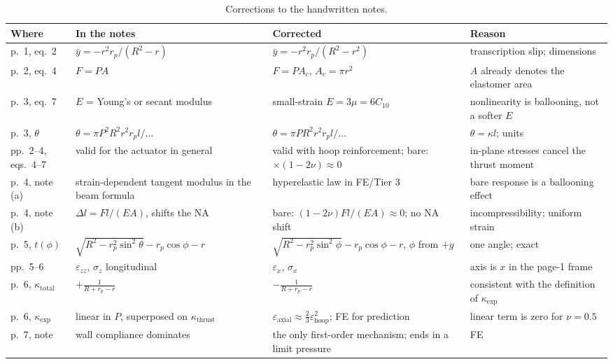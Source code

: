 \documentclass[11pt,a4paper]{article}
\numberwithin{equation}{section}
\newcommand{\rp}{r_p}
\begin{document}
\begin{table}[H]
\centering\small
\renewcommand{\arraystretch}{1.25}
\begin{tabularx}{\textwidth}{@{}l>{\raggedright\arraybackslash}X>{\raggedright\arraybackslash}X>{\raggedright\arraybackslash}X@{}}
\toprule
Where & In the notes & Corrected & Reason\\
\midrule
p.~1, eq.~2 & $\bar y = -r^2\rp/(R^2-r)$ & $\bar y = -r^2\rp/(R^2-r^2)$ & transcription slip; dimensions\\
p.~2, eq.~4 & $F = PA$ & $F = PA_c$, $A_c=\pi r^2$ & $A$ already denotes the elastomer area\\
p.~3, eq.~7 & $E$ = Young's or secant modulus & small-strain $E = 3\mu = 6C_{10}$ & nonlinearity is ballooning, not a softer $E$\\
p.~3, $\theta$ & $\theta = \pi P^2R^2r^2\rp l/\ldots$ & $\theta = \pi P R^2r^2\rp l/\ldots$ & $\theta=\kappa l$; units\\
pp.~2--4, eqs.~4--7 & valid for the actuator in general & valid with hoop reinforcement; bare: $\times(1-2\nu)\approx0$ & in-plane stresses cancel the thrust moment\\
p.~4, note (a) & strain-dependent tangent modulus in the beam formula & hyperelastic law in FE/Tier 3 & bare response is a ballooning effect\\
p.~4, note (b) & $\Delta l = Fl/(EA)$, shifts the NA & bare: $(1-2\nu)Fl/(EA)\approx0$; no NA shift & incompressibility; uniform strain\\
p.~5, $t(\phi)$ & $\sqrt{R^2-\rp^2\sin^2\theta}-\rp\cos\phi-r$ & $\sqrt{R^2-\rp^2\sin^2\phi}-\rp\cos\phi-r$, $\phi$ from $+y$ & one angle; exact\\
pp.~5--6 & $\varepsilon_{zz}$, $\sigma_z$ longitudinal & $\varepsilon_x$, $\sigma_x$ & axis is $x$ in the page-1 frame\\
p.~6, $\kappa_{\text{total}}$ & $+\frac{1}{R+\rp-r}$ & $-\frac{1}{R+\rp-r}$ & consistent with the definition of $\kappa_{\exp}$\\
p.~6, $\kappa_{\exp}$ & linear in $P$, superposed on $\kappa_{\text{thrust}}$ & $\varepsilon_{\text{axial}}\approx\frac23\varepsilon_{\text{hoop}}^2$; FE for prediction & linear term is zero for $\nu=0.5$\\
p.~7, note & wall compliance dominates & the only first-order mechanism; ends in a limit pressure & FE\\
\bottomrule
\end{tabularx}
\caption{Corrections to the handwritten notes.}
\label{tab:corrections}
\end{table}
\end{document}
